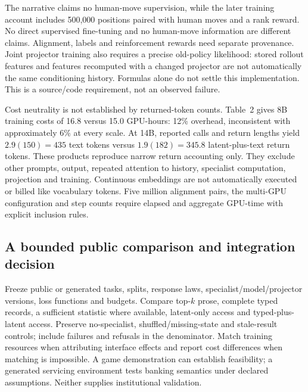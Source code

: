 The narrative claims no human-move supervision, while the later training account includes 500,000 positions paired with human moves and a rank reward. No direct supervised fine-tuning and no human-move information are different claims. Alignment, labels and reinforcement rewards need separate provenance. Joint projector training also requires a precise old-policy likelihood: stored rollout features and features recomputed with a changed projector are not automatically the same conditioning history. Formulas alone do not settle this implementation. This is a source/code requirement, not an observed failure.\citep{exec24_collaboration_original}

Cost neutrality is not established by returned-token counts. Table~2 gives 8B training costs of 16.8 versus 15.0 GPU-hours: 12\% overhead, inconsistent with approximately 6\% at every scale. At 14B, reported calls and return lengths yield $2.9(150)=435$ text tokens versus $1.9(182)=345.8$ latent-plus-text return tokens. These products reproduce narrow return accounting only. They exclude other prompts, output, repeated attention to history, specialist computation, projection and training. Continuous embeddings are not automatically executed or billed like vocabulary tokens. Five million alignment pairs, the multi-GPU configuration and step counts require elapsed and aggregate GPU-time with explicit inclusion rules.\citep{exec24_collaboration_original,exec24_collaboration_reference}

\subsection{A bounded public comparison and integration decision}
Freeze public or generated tasks, splits, response laws, specialist/model/projector versions, loss functions and budgets. Compare top-$k$ prose, complete typed records, a sufficient statistic where available, latent-only access and typed-plus-latent access. Preserve no-specialist, shuffled/missing-state and stale-result controls; include failures and refusals in the denominator. Match training resources when attributing interface effects and report cost differences when matching is impossible. A game demonstration can establish feasibility; a generated servicing environment tests banking semantics under declared assumptions. Neither supplies institutional validation.\citep{exec24_collaboration_original,exec24_collaboration_reference}

